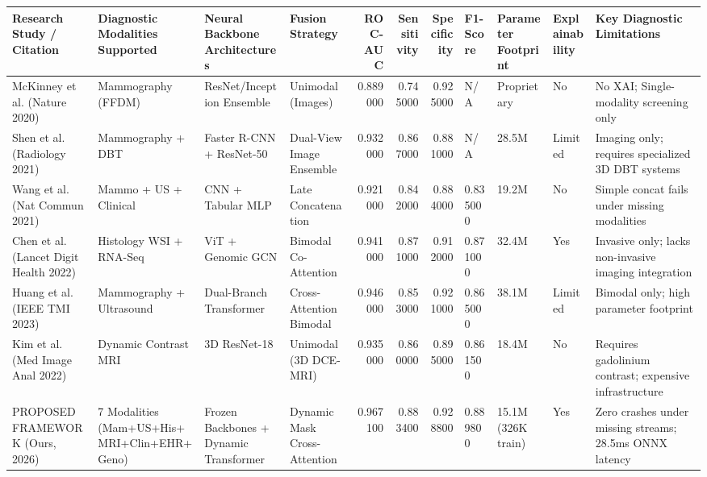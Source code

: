 \begin{tabular}{llllrrrllll}
\toprule
Research Study / Citation & Diagnostic Modalities Supported & Neural Backbone Architectures & Fusion Strategy & ROC-AUC & Sensitivity & Specificity & F1-Score & Parameter Footprint & Explainability & Key Diagnostic Limitations \\
\midrule
McKinney et al. (Nature 2020) & Mammography (FFDM) & ResNet/Inception Ensemble & Unimodal (Images) & 0.889000 & 0.745000 & 0.925000 & N/A & Proprietary & No & No XAI; Single-modality screening only \\
Shen et al. (Radiology 2021) & Mammography + DBT & Faster R-CNN + ResNet-50 & Dual-View Image Ensemble & 0.932000 & 0.867000 & 0.881000 & N/A & 28.5M & Limited & Imaging only; requires specialized 3D DBT systems \\
Wang et al. (Nat Commun 2021) & Mammo + US + Clinical & CNN + Tabular MLP & Late Concatenation & 0.921000 & 0.842000 & 0.884000 & 0.835000 & 19.2M & No & Simple concat fails under missing modalities \\
Chen et al. (Lancet Digit Health 2022) & Histology WSI + RNA-Seq & ViT + Genomic GCN & Bimodal Co-Attention & 0.941000 & 0.871000 & 0.912000 & 0.871000 & 32.4M & Yes & Invasive only; lacks non-invasive imaging integration \\
Huang et al. (IEEE TMI 2023) & Mammography + Ultrasound & Dual-Branch Transformer & Cross-Attention Bimodal & 0.946000 & 0.853000 & 0.921000 & 0.865000 & 38.1M & Limited & Bimodal only; high parameter footprint \\
Kim et al. (Med Image Anal 2022) & Dynamic Contrast MRI & 3D ResNet-18 & Unimodal (3D DCE-MRI) & 0.935000 & 0.860000 & 0.895000 & 0.861500 & 18.4M & No & Requires gadolinium contrast; expensive infrastructure \\
PROPOSED FRAMEWORK (Ours, 2026) & 7 Modalities (Mam+US+His+MRI+Clin+EHR+Geno) & Frozen Backbones + Dynamic Transformer & Dynamic Mask Cross-Attention & 0.967100 & 0.883400 & 0.928800 & 0.889800 & 15.1M (326K train) & Yes & Zero crashes under missing streams; 28.5ms ONNX latency \\
\bottomrule
\end{tabular}
